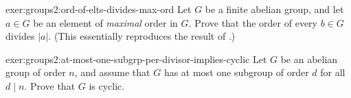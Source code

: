 \begin{exer}{}{exer:groups2:ord-of-elts-divides-max-ord}
  Let $G$ be a finite abelian group, and let $a \in G$ be an element
  of \emph{maximal} order in $G$. Prove that the order of every
  $b \in G$ divides $|a|$. (This essentially reproduces the result of
  .)
\end{exer}
\begin{exer}{}{exer:groups2:at-most-one-subgrp-per-divisor-implies-cyclic}
  Let $G$ be an abelian group of order $n$, and assume that $G$ has at
  most one subgroup of order $d$ for all $d \mid n$. Prove that $G$ is
  cyclic.
\end{exer}

